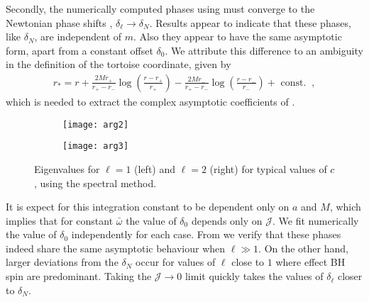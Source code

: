Secondly, the numerically computed phases using  must converge to the Newtonian phase shifts , $\delta_\ell \to\delta_N$.
Results appear to indicate that these phases, like $\delta_N$, are independent of $m$.
Also they appear to have the same asymptotic form, apart from a constant offset $\delta_0$. 
We attribute this difference to an ambiguity in the definition of the tortoise coordinate, given by
\begin{align}
    r_{*} = r +  \frac{2M r_{+}}{r_{+}-r_{-}} \log\left( \frac{r-r_{+}}{r_{+}}\right) -   \frac{2M r_{-}}{r_{+}-r_{-}} \log\left( \frac{r-r_{-}}{r_{-}} \right) + \text{ const. } ~,
\end{align}
which is needed to extract the complex asymptotic coefficients of .
\begin{figure}[h]
	\centering
	\vspace{0.2cm}
	\begin{subfigure}[c]{0.49\textwidth}
        \texttt{[image: arg2]}
    \end{subfigure}
    \hfill
    \begin{subfigure}[c]{0.48\textwidth}
        \texttt{[image: arg3]}
    \end{subfigure}
    \hfill
	\caption{Eigenvalues for $\ell=1$ (left) and $\ell=2$ (right) for typical values of $c$, using the spectral method.}
	\label{fig5:argZoutZin}
\end{figure}
It is expect for this integration constant to be dependent only on $a$ and $M$, which implies that for constant $\bar{\omega}$ the value of $\delta_0$ depends only on $\mathscr{J}$.
We fit numerically the value of $\delta_0$ independently for each case.
From  we verify that these phases indeed share the same asymptotic behaviour when $\ell\gg 1$.
On the other hand, larger deviations from the $\delta_N$ occur for values of $\ell$ close to $1$ where effect BH spin are predominant.
Taking the $\mathscr{J} \to 0$ limit quickly takes the values of $\delta_\ell$ closer to $\delta_N$.

